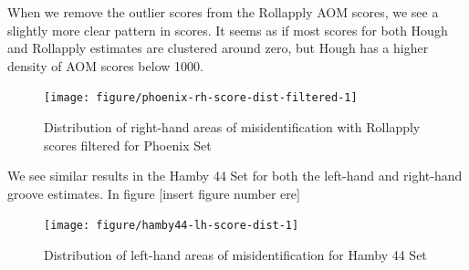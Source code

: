 \documentclass[12pt]{article}\usepackage[]{graphicx}\usepackage[]{color}
\newenvironment{knitrout}{}{} %
\theoremstyle{nonumberplain}
\begin{document}
When we remove the outlier scores from the Rollapply AOM scores, we see a slightly more clear pattern in scores. It seems as if most scores for both Hough and Rollapply estimates are clustered around zero, but Hough has a higher density of AOM scores below 1000. 

\begin{knitrout}
\color{fgcolor}\begin{figure}

{\centering \texttt{[image: figure/phoenix-rh-score-dist-filtered-1]} 

}

\caption[Distribution of right-hand areas of misidentification with Rollapply scores filtered for Phoenix Set]{Distribution of right-hand areas of misidentification with Rollapply scores filtered for Phoenix Set}\label{fig:phoenix-rh-score-dist-filtered}
\end{figure}


\end{knitrout}

We see similar results in the Hamby 44 Set for both the left-hand and right-hand groove estimates. In figure [insert figure number ere] 

\begin{knitrout}
\color{fgcolor}\begin{figure}

{\centering \texttt{[image: figure/hamby44-lh-score-dist-1]} 

}

\caption[Distribution of left-hand areas of misidentification for Hamby 44 Set]{Distribution of left-hand areas of misidentification for Hamby 44 Set}\label{fig:hamby44-lh-score-dist}
\end{figure}


\end{knitrout}

 
\end{document}
